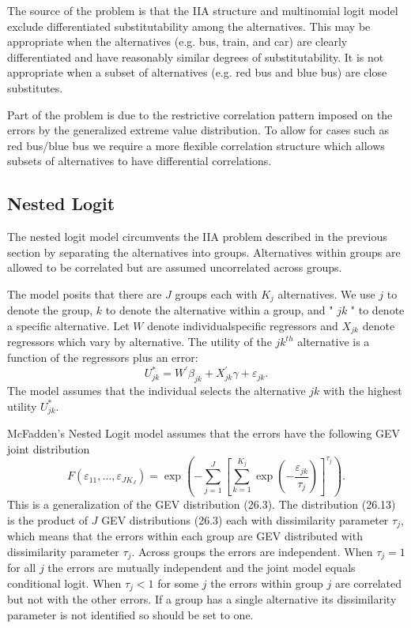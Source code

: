 \documentclass[10pt]{article}
\begin{document}
The source of the problem is that the IIA structure and multinomial logit model exclude differentiated substitutability among the alternatives. This may be appropriate when the alternatives (e.g. bus, train, and car) are clearly differentiated and have reasonably similar degrees of substitutability. It is not appropriate when a subset of alternatives (e.g. red bus and blue bus) are close substitutes.

Part of the problem is due to the restrictive correlation pattern imposed on the errors by the generalized extreme value distribution. To allow for cases such as red bus/blue bus we require a more flexible correlation structure which allows subsets of alternatives to have differential correlations.

\subsection{Nested Logit}
The nested logit model circumvents the IIA problem described in the previous section by separating the alternatives into groups. Alternatives within groups are allowed to be correlated but are assumed uncorrelated across groups.

The model posits that there are $J$ groups each with $K_{j}$ alternatives. We use $j$ to denote the group, $k$ to denote the alternative within a group, and " $j k$ " to denote a specific alternative. Let $W$ denote individualspecific regressors and $X_{j k}$ denote regressors which vary by alternative. The utility of the $j k^{t h}$ alternative is a function of the regressors plus an error:
$$
U_{j k}^{*}=W^{\prime} \beta_{j k}+X_{j k}^{\prime} \gamma+\varepsilon_{j k} .
$$
The model assumes that the individual selects the alternative $j k$ with the highest utility $U_{j k}^{*}$.

McFadden's Nested Logit model assumes that the errors have the following GEV joint distribution
$$
F\left(\varepsilon_{11}, \ldots, \varepsilon_{J K_{J}}\right)=\exp \left(-\sum_{j=1}^{J}\left[\sum_{k=1}^{K_{j}} \exp \left(-\frac{\varepsilon_{j k}}{\tau_{j}}\right)\right]^{\tau_{j}}\right) .
$$
This is a generalization of the GEV distribution (26.3). The distribution (26.13) is the product of $J$ GEV distributions (26.3) each with dissimilarity parameter $\tau_{j}$, which means that the errors within each group are GEV distributed with dissimilarity parameter $\tau_{j}$. Across groups the errors are independent. When $\tau_{j}=1$ for all $j$ the errors are mutually independent and the joint model equals conditional logit. When $\tau_{j}<1$ for some $j$ the errors within group $j$ are correlated but not with the other errors. If a group has a single alternative its dissimilarity parameter is not identified so should be set to one.
\end{document}
